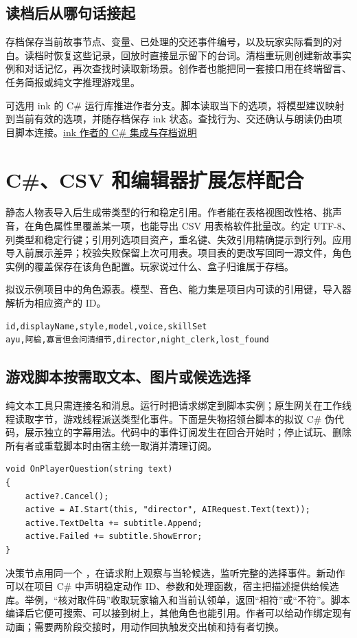 \documentclass[UTF8,11pt,fontset=fandol,a4paper]{ctexart}
\newcommand{\pg}[1]{\clearpage\section{#1}}
\newcommand{\f}[1]{\texttt{\detokenize{#1}}}
\newcommand{\src}[2]{\href{#1}{#2}}
\newcommand{\figcap}[1]{\par{\small\color{muted}\noindent #1\par}}
\begin{document}
\subsection*{读档后从哪句话接起}

存档保存当前故事节点、变量、已处理的交还事件编号，以及玩家实际看到的对白。读档时恢复这些记录，回放时直接显示留下的台词。清档重玩则创建新故事实例和对话记忆，再次查找时读取新场景。创作者也能把同一套接口用在终端留言、任务简报或纯文字推理游戏里。

可选用 ink 的 C\# 运行库推进作者分支。脚本读取当下的选项，将模型建议映射到当前有效的选项，并随存档保存 ink 状态。查找行为、交还确认与朗读仍由项目脚本连接。\src{https://github.com/inkle/ink/blob/master/Documentation/RunningYourInk.md}{ink 作者的 C\# 集成与存档说明}

\pg{C\#、CSV 和编辑器扩展怎样配合}
静态人物表导入后生成带类型的行和稳定引用。作者能在表格视图改性格、挑声音，在角色属性里覆盖某一项，也能导出 CSV 用表格软件批量改。约定 UTF-8、列类型和稳定行键；引用列选项目资产，重名键、失效引用精确提示到行列。应用导入前展示差异；校验失败保留上次可用表。项目表的更改写回同一源文件，角色实例的覆盖保存在该角色配置。玩家说过什么、盒子归谁属于存档。

\figcap{拟议示例\quad 项目中的角色源表。模型、音色、能力集是项目内可读的引用键，导入器解析为相应资产的 ID。}
{\small\begin{verbatim}
id,displayName,style,model,voice,skillSet
ayu,阿榆,寡言但会问清细节,director,night_clerk,lost_found
\end{verbatim}
}
\subsection*{游戏脚本按需取文本、图片或候选选择}
纯文本工具只需连接名和消息。运行时把请求绑定到脚本实例；原生网关在工作线程读取字节，游戏线程派送类型化事件。下面是失物招领台脚本的拟议 C\# 伪代码，展示独立的字幕用法。代码中的事件订阅发生在回合开始时；停止试玩、删除所有者或重载脚本时由宿主统一取消并清理订阅。

{\small\begin{verbatim}
void OnPlayerQuestion(string text)
{
    active?.Cancel();
    active = AI.Start(this, "director", AIRequest.Text(text));
    active.TextDelta += subtitle.Append;
    active.Failed += subtitle.ShowError;
}
\end{verbatim}
}

决策节点用同一个 \f{AI.Start}，在请求附上观察与当轮候选，监听完整的选择事件。新动作可以在项目 C\# 中声明稳定动作 ID、参数和处理函数，宿主把描述提供给候选库。举例，“核对取件码”收取玩家输入和当前认领单，返回“相符”或“不符”。脚本编译后它便可搜索、可以接到树上，其他角色也能引用。作者可以给动作绑定现有动画；需要两阶段交接时，用动作回执触发交出帧和持有者切换。
\end{document}
